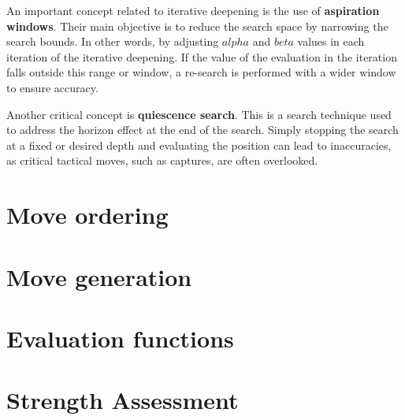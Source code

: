 An important concept related to iterative deepening is the use of \textbf{aspiration windows}. Their main objective is to reduce the search space by narrowing the search bounds. In other words, by adjusting $alpha$ and $beta$ values in each iteration of the iterative deepening. If the value of the evaluation in the iteration falls outside this range or window, a re-search is performed with a wider window to ensure accuracy.

\vspace{1em}

Another critical concept is \textbf{quiescence search}. This is a search technique used to address the horizon effect at the end of the search. Simply stopping the search at a fixed or desired depth and evaluating the position can lead to inaccuracies, as critical tactical moves, such as captures, are often overlooked.


\section{Move ordering}

\section{Move generation}

\section{Evaluation functions}

\section{Strength Assessment}


